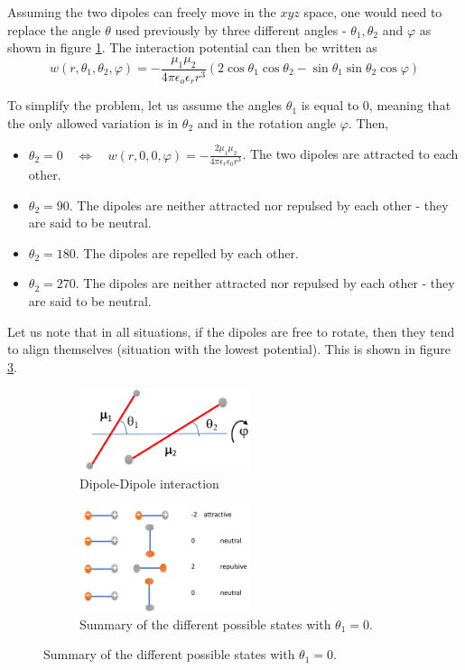 \documentclass[../phys-f308.tex]{subfiles}
\begin{document}
    Assuming the two dipoles can freely move in the $xyz$ space, one would need to replace the angle $\theta$ used previously by three different angles - $\theta_1,\theta_2$ and $\varphi$ as shown in figure \ref{fig: DDipole}. The interaction potential can then be written as
    \begin{equation}
        w(r,\theta_1,\theta_2,\varphi) = -\frac{\mu_1\mu_2}{4\pi\epsilon_o\epsilon_r r^3}\left(2\cos\theta_1\cos\theta_2-\sin\theta_1\sin\theta_2\cos\varphi\right)
    \end{equation}

    To simplify the problem, let us assume the angles $\theta_1$ is equal to $0$, meaning that the only allowed variation is in $\theta_2$ and in the rotation angle $\varphi$. Then,
    \begin{itemize}
        \item $\theta_2 = 0 \quad \Leftrightarrow \quad w(r,0,0,\varphi) = -\frac{2\mu_1\mu_2}{4\pi\epsilon_r\epsilon_0 r^3}$. The two dipoles are attracted to each other.
        \item $\theta_2 = 90$. The dipoles are neither attracted nor repulsed by each other - they are said to be neutral. 
        \item $\theta_2 = 180$. The dipoles are repelled by each other. 
        \item $\theta_2 = 270$. The dipoles are neither attracted nor repulsed by each other - they are said to be neutral.
    \end{itemize}
        Let us note that in all situations, if the dipoles are free to rotate, then they tend to align themselves (situation with the lowest potential). This is shown in figure \ref{dif: DDipole theta1 = 0}.
    
    \begin{figure}[H]
        \begin{subfigure}{.5\textwidth}
            \centering
            \includegraphics[width=50mm]{partA/Pictures/DDipole.png}
            \caption{Dipole-Dipole interaction}
            \label{fig: DDipole}
        \end{subfigure}
        \begin{subfigure}{.5\textwidth}
            \centering
            \includegraphics[width=50mm]{partA/Pictures/DDipole_interactions.png}
            \caption{Summary of the different possible states with $\theta_1 = 0$.}
            \label{dif: DDipole theta1 = 0}
        \end{subfigure}
    \end{figure}
\end{document}
